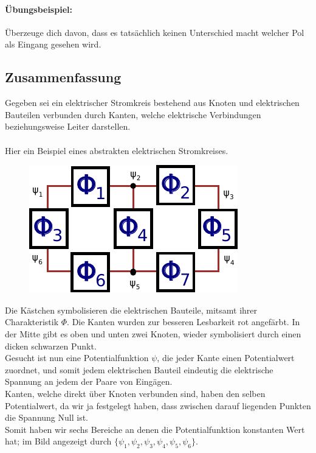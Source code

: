 \documentclass[11pt,a4paper,leqno]{report}
\numberwithin{equation}{chapter}
\begin{document}
\paragraph{\"Ubungsbeispiel:} \"Uberzeuge dich davon, dass es tats\"achlich keinen Unterschied macht welcher Pol als Eingang gesehen wird. 
\subsection{Zusammenfassung}
Gegeben sei ein elektrischer Stromkreis bestehend aus Knoten und elektrischen Bauteilen verbunden durch Kanten, welche elektrische Verbindungen beziehungsweise Leiter darstellen.
\\
\\
Hier ein Beispiel eines abstrakten elektrischen Stromkreises. 
\begin{figure}[H]
	\begin{center}
		\includegraphics[scale=1]{Bilder/_abstract.pdf}
	\end{center}
\end{figure}
\noindent
Die K\"astchen symbolisieren die elektrischen Bauteile, mitsamt ihrer Charakteristik $\Phi$. Die Kanten wurden zur besseren Lesbarkeit rot angef\"arbt. In der Mitte gibt es oben und unten zwei Knoten, wieder symbolisiert durch einen dicken schwarzen Punkt.\\
Gesucht ist nun eine Potentialfunktion $\psi$, die jeder Kante einen Potentialwert zuordnet, und somit jedem elektrischen Bauteil eindeutig die elektrische Spannung an jedem der Paare von Eing\"agen.\\
Kanten, welche direkt \"uber Knoten verbunden sind, haben den selben Potentialwert, da wir ja festgelegt haben, dass zwischen darauf liegenden Punkten die Spannung Null ist.\\
Somit haben wir sechs Bereiche an denen die Potentialfunktion konstanten Wert hat; im Bild angezeigt durch $\{\psi_1, \psi_2, \psi_3, \psi_4, \psi_5, \psi_6\}$. 
\end{document}
